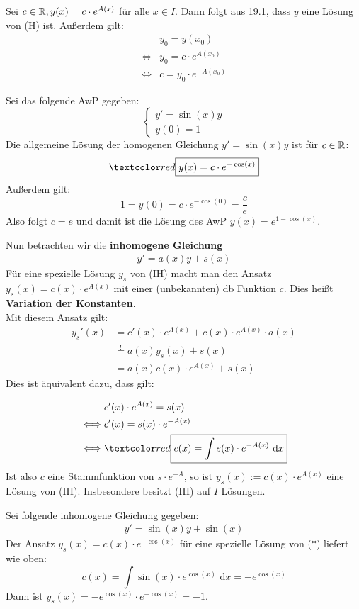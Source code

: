 \documentclass[a4paper,oneside,DIV15,BCOR12mm,chapterprefix=true,headings=onelinechapter]{scrbook}
\begin{document}
\begin{beweis}
Sei $c\in\mathbb{R},y(x)=c\cdot e^{A(x)}$ für alle $x\in I$. Dann folgt aus 19.1, dass
$y$ eine Lösung von (H) ist. Außerdem gilt:
\begin{align*}
&y_0=y(x_0)\\
\iff &y_0=c\cdot e^{A(x_0)}\\
\iff &c=y_0\cdot e^{-A(x_0)}
\end{align*}
\end{beweis}

\begin{beispiel}
Sei das folgende AwP gegeben:
\[\begin{cases}
y'=\sin(x)y\\
y(0)=1
\end{cases}\]
Die allgemeine Lösung der homogenen Gleichung $y'=\sin(x)y$ ist für $c\in\mathbb{R}$:
\[\importantbox{y(x)=c\cdot e^{-\cos(x)}}\]
Außerdem gilt:
\[1=y(0)=c\cdot e^{-\cos(0)}=\frac ce\]
Also folgt $c=e$ und damit ist die Lösung des AwP $y(x)=e^{1-\cos(x)}$.
\end{beispiel}

Nun betrachten wir die \textbf{inhomogene Gleichung}
\begin{align*}
y'=a(x)y+s(x)\tag{IH}
\end{align*}
Für eine spezielle Lösung $y_s$ von (IH) macht man den Ansatz $y_s(x)=c(x)\cdot e^{A(x)}$ 
mit einer (unbekannten) db Funktion $c$. Dies heißt \textbf{Variation der Konstanten}.\\
Mit diesem Ansatz gilt:
\begin{align*}
y_s'(x)&=c'(x)\cdot e^{A(x)}+c(x)\cdot e^{A(x)}\cdot a(x)\\
&\stackrel{!}{=}a(x)y_s(x)+s(x)\\
&=a(x)c(x)\cdot e^{A(x)}+s(x)
\end{align*}
Dies ist äquivalent dazu, dass gilt:

\begin{align*}
&c'(x)\cdot e^{A(x)}=s(x)\\
\iff &c'(x)=s(x)\cdot e^{-A(x)}\\
\iff &\importantbox{c(x)=\int s(x)\cdot e^{-A(x)}\text{ d}x}
\end{align*}
Ist also $c$ eine Stammfunktion von $s\cdot e^{-A}$, so ist $y_s(x):=c(x)\cdot e^{A(x)}$
eine Lösung von (IH). Insbesondere besitzt (IH) auf $I$ Lösungen.

\begin{beispiel}
Sei folgende inhomogene Gleichung gegeben:
\begin{align*}
y'=\sin(x)y+\sin(x)\tag{$*$}
\end{align*}
Der Ansatz $y_s(x)=c(x)\cdot e^{-\cos(x)}$ für eine spezielle Lösung von ($*$) liefert wie oben:
\[c(x)=\int \sin(x)\cdot e^{\cos(x)}\text{ d}x = -e^{\cos(x)}\]
Dann ist $y_s(x)=-e^{\cos(x)}\cdot e^{-\cos(x)}=-1$.
\end{beispiel}
\end{document}
